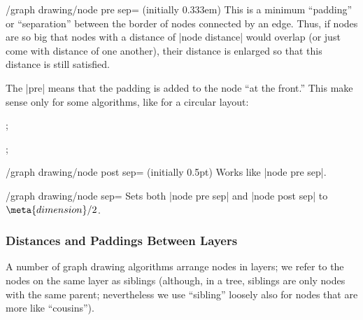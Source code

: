 \begin{key}{/graph drawing/node pre sep= (initially 0.333em)}
  This is a minimum ``padding'' or ``separation'' between the border
  of nodes connected by an edge. Thus, if nodes are so big that nodes
  with a distance of |node distance| would overlap (or
  just come with  distance of one another), their
  distance is enlarged so that this distance is still satisfied.

  The |pre| means that the padding is added to the node ``at the
  front.'' This make sense only for some algorithms, like for a
  circular layout:
  
\begin{codeexample}[]
\tikz {};
\end{codeexample}
\begin{codeexample}[]
\tikz {};  
\end{codeexample}
\end{key}

\begin{key}{/graph drawing/node post sep= (initially 0.5pt)}
  Works like |node pre sep|.
\end{key}

\begin{key}{/graph drawing/node sep=}
  Sets both |node pre sep| and |node post sep| to
  $\meta{dimension}/2$.
\end{key}


\subsubsection{Distances and Paddings Between Layers}

A number of graph drawing algorithms arrange nodes in layers; we refer
to the nodes on the same layer as siblings (although, in a tree,
siblings are only nodes with the same parent; nevertheless we use
``sibling'' loosely also for nodes that are more like ``cousins'').

